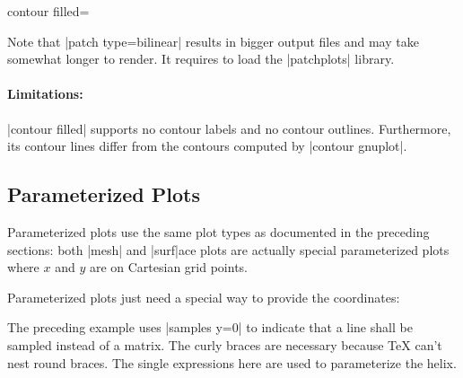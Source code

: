 {{\begin{plottype}[/pgfplots]{
    contour filled=\textcolor{black}{}%
}
\begin{codeexample}[]
\end{codeexample}
    \noindent Note that |patch type=bilinear| results in bigger output files
    and may take somewhat longer to render. It requires to load the
    |patchplots| library.


    \paragraph{Limitations:}

    |contour filled| supports no contour labels and no contour outlines.
    Furthermore, its contour lines differ from the contours computed by
    |contour gnuplot|.
\end{plottype}
}


\subsection{Parameterized Plots}

{

Parameterized plots use the same plot types as documented in the preceding
sections: both |mesh| and |surf|ace plots are actually special parameterized
plots where $x$ and $y$ are on Cartesian grid points.

Parameterized plots just need a special way to provide the coordinates:

\pgfplotsexpensiveexample
\begin{codeexample}[]
\end{codeexample}

\noindent The preceding example uses |samples y=0| to indicate that a line
shall be sampled instead of a matrix. The curly braces are necessary because
\TeX{} can't nest round braces. The single expressions here are used to
parameterize the helix.

}}

